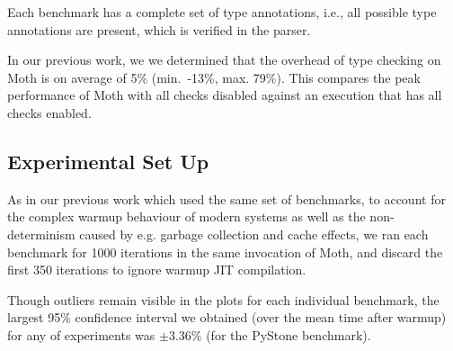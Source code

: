 \documentclass[sigplan,10pt,review,screen]{acmart}\settopmatter{printfolios=true}
\newcommand{\ie}{i.e.\xspace}
\newcommand{\eg}{e.g.\xspace}
\begin{document}

Each benchmark has a complete set of type annotations,
\ie, all possible type annotations are present,
which is verified in the parser.

In our previous work, we \cite{roberts-and-co-ecoop-2019}
we determined that the overhead of type checking on Moth is on average
of 5\% (min.\ -13\%, max. 79\%).
This compares the peak performance of Moth with all
checks disabled against an execution that has all checks enabled. 
%

\subsection{Experimental Set Up}
As in our previous work \cite{roberts-and-co-ecoop-2019} which used the same set of benchmarks, to account for the complex warmup behaviour of modern systems \citep{Barrett:2017:VMW} as well as
the non-determinism caused by \eg garbage collection and cache effects, we ran each benchmark for 1000 iterations in the same invocation of Moth, and discard the first 350 iterations to ignore warmup JIT compilation.

Though outliers remain visible in the plots for each individual benchmark, the largest 95\% confidence interval we obtained (over the mean time after warmup) for any of experiments was $\pm3.36\%$ (for the PyStone benchmark).
\end{document}
